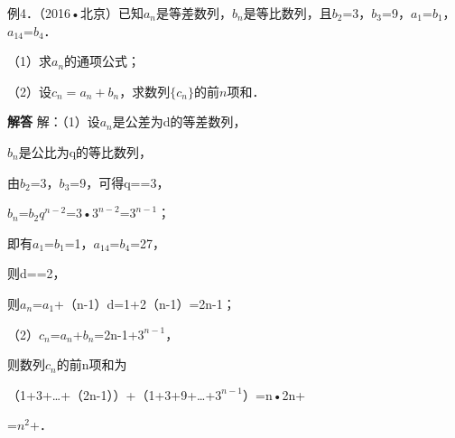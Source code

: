 例4．（2016•北京）已知{\ensuremath{a_{n}}}是等差数列，{\ensuremath{b_{n}}}是等比数列，且\ensuremath{b_{2}}=3，\ensuremath{b_{3}}=9，\ensuremath{a_{1}}=\ensuremath{b_{1}}，\ensuremath{a_{14}}=\ensuremath{b_{4}}．\par
（1）求{\ensuremath{a_{n}}}的通项公式；\par
（2）设$c_n=a_n+b_n$，求数列$\{c_n\}$的前$n$项和．\par
\QuestionSpace{3.5cm}
\ifshowanswers
\par\begingroup\color{solutioncolor}\noindent\textbf{解答}\quad
解：（1）设{\ensuremath{a_{n}}}是公差为d的等差数列，\par
{\ensuremath{b_{n}}}是公比为q的等比数列，\par
由\ensuremath{b_{2}}=3，\ensuremath{b_{3}}=9，可得q==3，\par
\ensuremath{b_{n}}=\ensuremath{b_{2}}\ensuremath{q^{n-2}}=3•\ensuremath{3^{n-2}}=\ensuremath{3^{n-1}}；\par
即有\ensuremath{a_{1}}=\ensuremath{b_{1}}=1，\ensuremath{a_{14}}=\ensuremath{b_{4}}=27，\par
则d==2，\par
则\ensuremath{a_{n}}=\ensuremath{a_{1}}+（n-1）d=1+2（n-1）=2n-1；\par
（2）\ensuremath{c_{n}}=\ensuremath{a_{n}}+\ensuremath{b_{n}}=2n-1+\ensuremath{3^{n-1}}，\par
则数列{\ensuremath{c_{n}}}的前n项和为\par
（1+3+\ldots{}+（2n-1））+（1+3+9+\ldots{}+\ensuremath{3^{n-1}}）=n•2n+\par
=\ensuremath{n^{2}}+．\par
\par\endgroup\fi

